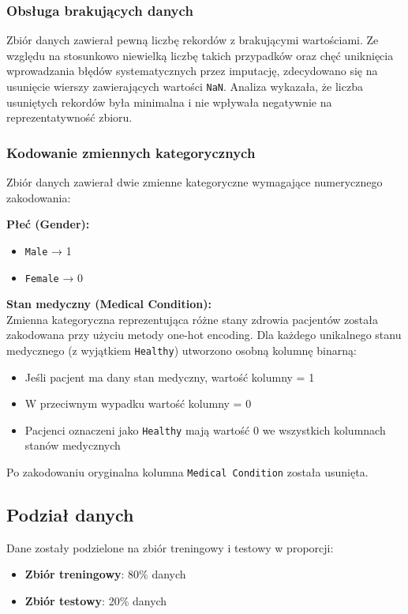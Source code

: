 \subsubsection{Obsługa brakujących danych}

Zbiór danych zawierał pewną liczbę rekordów z brakującymi wartościami. Ze względu na stosunkowo niewielką liczbę takich przypadków oraz chęć uniknięcia wprowadzania błędów systematycznych przez imputację, zdecydowano się na usunięcie wierszy zawierających wartości \texttt{NaN}. Analiza wykazała, że liczba usuniętych rekordów była minimalna i nie wpływała negatywnie na reprezentatywność zbioru.

\subsubsection{Kodowanie zmiennych kategorycznych}

Zbiór danych zawierał dwie zmienne kategoryczne wymagające numerycznego zakodowania:

\textbf{Płeć (Gender):}
\begin{itemize}
    \item \texttt{Male} → 1
    \item \texttt{Female} → 0
\end{itemize}

\textbf{Stan medyczny (Medical Condition):}\\
Zmienna kategoryczna reprezentująca różne stany zdrowia pacjentów została zakodowana przy użyciu metody one-hot encoding. Dla każdego unikalnego stanu medycznego (z wyjątkiem \texttt{Healthy}) utworzono osobną kolumnę binarną:

\begin{itemize}
    \item Jeśli pacjent ma dany stan medyczny, wartość kolumny = 1
    \item W przeciwnym wypadku wartość kolumny = 0
    \item Pacjenci oznaczeni jako \texttt{Healthy} mają wartość 0 we wszystkich kolumnach stanów medycznych
\end{itemize}

Po zakodowaniu oryginalna kolumna \texttt{Medical Condition} została usunięta.

\subsection{Podział danych}

Dane zostały podzielone na zbiór treningowy i testowy w proporcji:
\begin{itemize}
    \item \textbf{Zbiór treningowy}: 80\% danych
    \item \textbf{Zbiór testowy}: 20\% danych
\end{itemize}


